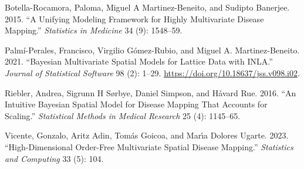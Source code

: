 \documentclass[
]{article}
\newlength{\cslhangindent}
\newenvironment{CSLReferences}[2] %
 {\begin{list}{}{%
  \setlength{\itemindent}{0pt}
  \setlength{\leftmargin}{0pt}
  \setlength{\parsep}{0pt}
  \ifodd #1
   \setlength{\leftmargin}{\cslhangindent}
   \setlength{\itemindent}{-1\cslhangindent}
  \fi
  \setlength{\itemsep}{#2\baselineskip}}}
 {\end{list}}
\begin{document}
\label{refs}
\begin{CSLReferences}{1}{0}
Botella-Rocamora, Paloma, Miguel A Martinez-Beneito, and Sudipto
Banerjee. 2015. {``A Unifying Modeling Framework for Highly Multivariate
Disease Mapping.''} \emph{Statistics in Medicine} 34 (9): 1548--59.

Palmí-Perales, Francisco, Virgilio Gómez-Rubio, and Miguel A.
Martinez-Beneito. 2021. {``Bayesian Multivariate Spatial Models for
Lattice Data with INLA.''} \emph{Journal of Statistical Software} 98
(2): 1--29. \url{https://doi.org/10.18637/jss.v098.i02}.

Riebler, Andrea, Sigrunn H Sørbye, Daniel Simpson, and Håvard Rue. 2016.
{``An Intuitive Bayesian Spatial Model for Disease Mapping That Accounts
for Scaling.''} \emph{Statistical Methods in Medical Research} 25 (4):
1145--65.

Vicente, Gonzalo, Aritz Adin, Tomás Goicoa, and Marı́a Dolores Ugarte.
2023. {``High-Dimensional Order-Free Multivariate Spatial Disease
Mapping.''} \emph{Statistics and Computing} 33 (5): 104.

\end{CSLReferences}
\end{document}
